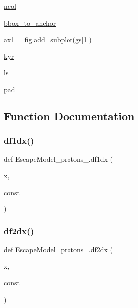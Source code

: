 \begin{DoxyCompactItemize}
\item 
\hyperlink{namespaceEscapeModel__protons__2_ab58dfa757cacc4c5c162d3e265f89461}{ncol}
\item 
\hyperlink{namespaceEscapeModel__protons__2_ac8279c1271a6a4a7c10ced55014f564e}{bbox\+\_\+to\+\_\+anchor}
\item 
\hyperlink{namespaceEscapeModel__protons__2_a00760e67ab6ca444c092e89cf6eaf6c1}{ax1} = fig.\+add\+\_\+subplot(\hyperlink{namespaceEscapeModel__protons__2_ac78144ff63b1cfafc81865301d7900d4}{gs}\mbox{[}1\mbox{]})
\item 
\hyperlink{namespaceEscapeModel__protons__2_a99e69e0b21047fd7ee2c9e45c25ca96f}{kyr}
\item 
\hyperlink{namespaceEscapeModel__protons__2_aa00ea637bd32750327aee4af549369ca}{ls}
\item 
\hyperlink{namespaceEscapeModel__protons__2_a45d06c8b8c69370f77754f80a8503e8b}{pad}
\end{DoxyCompactItemize}


\subsection{Function Documentation}
\mbox{\label{namespaceEscapeModel__protons__2_a3695abc72640f6a458d751cc44acc396}} 
\subsubsection{\texorpdfstring{df1dx()}{df1dx()}}
{\footnotesize\ttfamily def Escape\+Model\+\_\+protons\+\_.\+df1dx (\begin{DoxyParamCaption}\item[{}]{x,  }\item[{}]{const }\end{DoxyParamCaption})}

\mbox{\label{namespaceEscapeModel__protons__2_a8236938c2501dfeddd9271efecae3099}} 
\subsubsection{\texorpdfstring{df2dx()}{df2dx()}}
{\footnotesize\ttfamily def Escape\+Model\+\_\+protons\+\_.\+df2dx (\begin{DoxyParamCaption}\item[{}]{x,  }\item[{}]{const }\end{DoxyParamCaption})}

